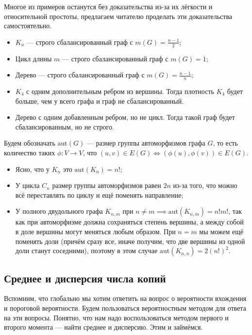 \begin{example}
  Многое из примеров останутся без доказательства из-за их лёгкости и 
  относительной простоты, предлагаем читателю проделать эти доказательства 
  самостоятельно.
  \begin{itemize}
    \item $K_n$ --- строго сбалансированный граф с $m(G) = \frac{n - 1}{2}$;
    \item Цикл длины $m$ --- строго сбалансированный граф с $m(G) = 1$;
    \item Дерево --- строго сбалансированный граф с $m(G) = \frac{n - 1}{n}$;
    \item $K_4$ с одним дополнительным ребром из вершины. Тогда плотность $K_4$
    будет больше, чем у всего графа и граф не сбалансированный.
    \item Дерево с одним добавленным ребром, но не цикл. Тогда такой граф будет
    сбалансированным, но не строго.
  \end{itemize}
\end{example}

\begin{definition}
  Будем обозначать $\mathrm{aut}(G)$ --- размер группы автоморфизмов графа $G$,
  то есть количество таких $\phi: V \to V$, что $(u, v) \in E(G) \iff (\phi(u), \phi(v)) \in E(G)$.
\end{definition}

\begin{itemize}
  \item Ясно, что у $K_n$ это $\mathrm{aut}(K_n) = n!$;
  \item У цикла $C_n$ размер группы автоморфизмов равен $2n$ из-за того, что можно
  всё переставлять по циклу и ещё поменять направление;
  \item У полного двудольного графа $K_{n, m}$ при $n \neq m \implies \mathrm{aut}(K_{n, m}) =
  n!m!$, так как при автоморфизме должна сохраняться степень вершины, а между
  собой в доле вершины могут меняться любым образом. При $n = m$ мы можем ещё поменять
  доли (причём сразу все, иначе получим, что две вершины из одной доли станут соседними),
  поэтому в этом случае $\mathrm{aut}(K_{n, n}) = 2(n!)^2$.
\end{itemize}

\subsection{Среднее и дисперсия числа копий}

Вспомним, что глобально мы хотим ответить на вопрос о вероятности вхождения и пороговой
вероятности. Будем пользоваться вероятностным методом для ответа на эти вопросы.
Понятно, что нам надо воспользоваться методом первого и второго момента --- найти
среднее и дисперсию. Этим и займёмся.

